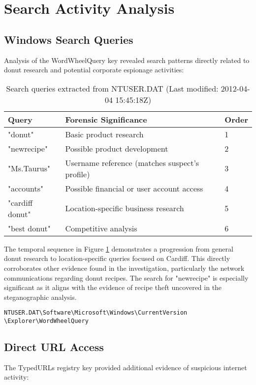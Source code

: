 \section{Search Activity Analysis}
\subsection{Windows Search Queries}
Analysis of the WordWheelQuery key revealed search patterns directly related to donut research and potential corporate espionage activities:

\begin{table}[h]
    \centering
    \begin{tabular}{|l|p{10cm}|l|}
        \hline
        \textbf{Query} & \textbf{Forensic Significance} & \textbf{Order} \\
        \hline
        "donut" & Basic product research & 1 \\
        \hline
        "newrecipe" & Possible product development & 2 \\
        \hline
        "Ms.Taurus" & Username reference (matches suspect's profile) & 3 \\
        \hline
        "accounts" & Possible financial or user account access & 4 \\
        \hline
        "cardiff donut" & Location-specific business research & 5 \\
        \hline
        "best donut" & Competitive analysis & 6 \\
        \hline
    \end{tabular}
    \caption{Search queries extracted from NTUSER.DAT (Last modified: 2012-04-04 15:45:18Z)}
    \label{tab:search_queries}
\end{table}

The temporal sequence in Figure \ref{tab:search_queries} demonstrates a progression from general donut research to location-specific queries focused on Cardiff. This directly corroborates other evidence found in the investigation, particularly the network communications regarding donut recipes. The search for "newrecipe" is especially significant as it aligns with the evidence of recipe theft uncovered in the steganographic analysis.

\texttt{\small NTUSER.DAT\textbackslash Software\textbackslash Microsoft\textbackslash Windows\textbackslash CurrentVersion\\\textbackslash Explorer\textbackslash WordWheelQuery}

\subsection{Direct URL Access}
The TypedURLs registry key provided additional evidence of suspicious internet activity:


